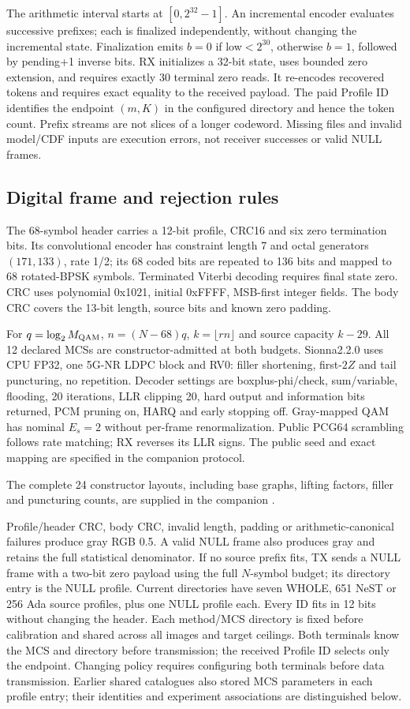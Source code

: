 \documentclass[10pt,letterpaper]{article}
\begin{document}
The arithmetic interval starts at $[0,2^{32}-1]$. An incremental encoder evaluates successive prefixes; each is finalized independently, without changing the incremental state. Finalization emits $b=0$ if low$<2^{30}$, otherwise $b=1$, followed by pending+1 inverse bits. RX initializes a 32-bit state, uses bounded zero extension, and requires exactly 30 terminal zero reads. It re-encodes recovered tokens and requires exact equality to the received payload. The paid Profile ID identifies the endpoint $(m,K)$ in the configured directory and hence the token count. Prefix streams are not slices of a longer codeword. Missing files and invalid model/CDF inputs are execution errors, not receiver successes or valid NULL frames.

\subsection{Digital frame and rejection rules}
The 68-symbol header carries a 12-bit profile, CRC16 and six zero termination bits. Its convolutional encoder has constraint length 7 and octal generators $(171,133)$, rate 1/2; its 68 coded bits are repeated to 136 bits and mapped to 68 rotated-BPSK symbols. Terminated Viterbi decoding requires final state zero. CRC uses polynomial 0x1021, initial 0xFFFF, MSB-first integer fields. The body CRC covers the 13-bit length, source bits and known zero padding.

For $q=\log_2M_{\rm QAM}$, $n=(N-68)q$, $k=\lfloor rn\rfloor$ and source capacity $k-29$. All 12 declared MCSs are constructor-admitted at both budgets. Sionna2.2.0 uses CPU FP32, one 5G-NR LDPC block and RV0: filler shortening, first-$2Z$ and tail puncturing, no repetition. Decoder settings are boxplus-phi/check, sum/variable, flooding, 20 iterations, LLR clipping 20, hard output and information bits returned, PCM pruning on, HARQ and early stopping off. Gray-mapped QAM has nominal $E_s=2$ without per-frame renormalization. Public PCG64 scrambling follows rate matching; RX reverses its LLR signs. The public seed and exact mapping are specified in the companion protocol.

The complete 24 constructor layouts, including base graphs, lifting factors, filler and puncturing counts, are supplied in the companion .

Profile/header CRC, body CRC, invalid length, padding or arithmetic-canonical failures produce gray RGB 0.5. A valid NULL frame also produces gray and retains the full statistical denominator. If no source prefix fits, TX sends a NULL frame with a two-bit zero payload using the full $N$-symbol budget; its directory entry is the NULL profile. Current directories have seven WHOLE, 651 NeST or 256 Ada source profiles, plus one NULL profile each. Every ID fits in 12 bits without changing the header. Each method/MCS directory is fixed before calibration and shared across all images and target ceilings. Both terminals know the MCS and directory before transmission; the received Profile ID selects only the endpoint. Changing policy requires configuring both terminals before data transmission. Earlier shared catalogues also stored MCS parameters in each profile entry; their identities and experiment associations are distinguished below.
\end{document}
